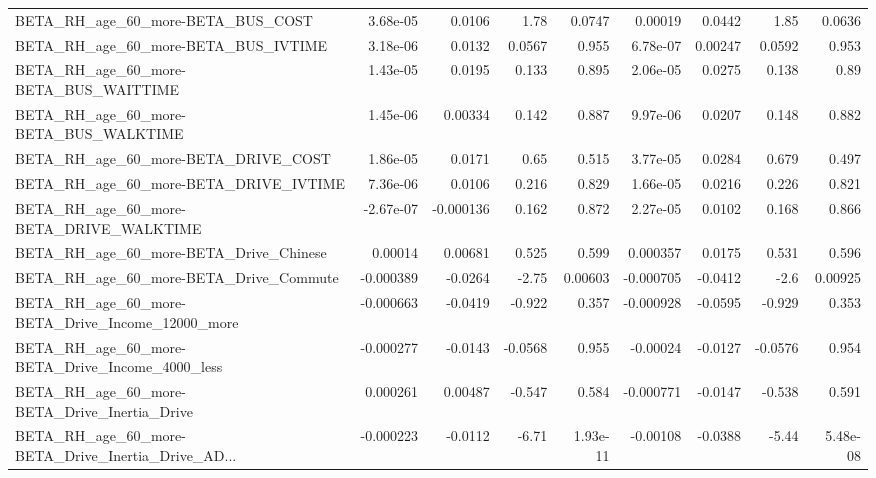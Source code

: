 \begin{tabular}{lrrrrrrrr}
BETA\_RH\_age\_60\_more-BETA\_BUS\_COST                  &    3.68e-05 &       0.0106 &     1.78 &   0.0747 &    0.00019 &      0.0442 &         1.85 &        0.0636 \\
BETA\_RH\_age\_60\_more-BETA\_BUS\_IVTIME                &    3.18e-06 &       0.0132 &   0.0567 &    0.955 &   6.78e-07 &     0.00247 &       0.0592 &         0.953 \\
BETA\_RH\_age\_60\_more-BETA\_BUS\_WAITTIME              &    1.43e-05 &       0.0195 &    0.133 &    0.895 &   2.06e-05 &      0.0275 &        0.138 &          0.89 \\
BETA\_RH\_age\_60\_more-BETA\_BUS\_WALKTIME              &    1.45e-06 &      0.00334 &    0.142 &    0.887 &   9.97e-06 &      0.0207 &        0.148 &         0.882 \\
BETA\_RH\_age\_60\_more-BETA\_DRIVE\_COST                &    1.86e-05 &       0.0171 &     0.65 &    0.515 &   3.77e-05 &      0.0284 &        0.679 &         0.497 \\
BETA\_RH\_age\_60\_more-BETA\_DRIVE\_IVTIME              &    7.36e-06 &       0.0106 &    0.216 &    0.829 &   1.66e-05 &      0.0216 &        0.226 &         0.821 \\
BETA\_RH\_age\_60\_more-BETA\_DRIVE\_WALKTIME            &   -2.67e-07 &    -0.000136 &    0.162 &    0.872 &   2.27e-05 &      0.0102 &        0.168 &         0.866 \\
BETA\_RH\_age\_60\_more-BETA\_Drive\_Chinese             &     0.00014 &      0.00681 &    0.525 &    0.599 &   0.000357 &      0.0175 &        0.531 &         0.596 \\
BETA\_RH\_age\_60\_more-BETA\_Drive\_Commute             &   -0.000389 &      -0.0264 &    -2.75 &  0.00603 &  -0.000705 &     -0.0412 &         -2.6 &       0.00925 \\
BETA\_RH\_age\_60\_more-BETA\_Drive\_Income\_12000\_more   &   -0.000663 &      -0.0419 &   -0.922 &    0.357 &  -0.000928 &     -0.0595 &       -0.929 &         0.353 \\
BETA\_RH\_age\_60\_more-BETA\_Drive\_Income\_4000\_less    &   -0.000277 &      -0.0143 &  -0.0568 &    0.955 &   -0.00024 &     -0.0127 &      -0.0576 &         0.954 \\
BETA\_RH\_age\_60\_more-BETA\_Drive\_Inertia\_Drive       &    0.000261 &      0.00487 &   -0.547 &    0.584 &  -0.000771 &     -0.0147 &       -0.538 &         0.591 \\
BETA\_RH\_age\_60\_more-BETA\_Drive\_Inertia\_Drive\_AD... &   -0.000223 &      -0.0112 &    -6.71 & 1.93e-11 &   -0.00108 &     -0.0388 &        -5.44 &      5.48e-08 \\

\end{tabular}
